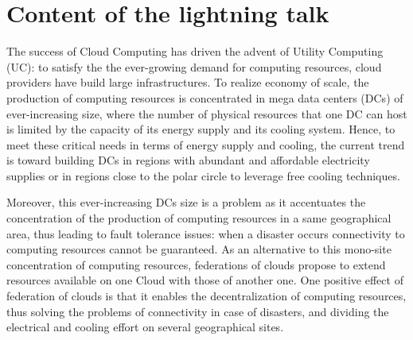 \section{Content of the lightning talk}
\label{sec:intro} 

The success of Cloud Computing has driven the advent of Utility Computing (UC): 
to satisfy the the ever-growing demand for computing resources, cloud providers 
have build large infrastructures. To realize economy of scale, the production
of computing resources is concentrated in mega data centers (DCs) of 
ever-increasing size, where the number of physical resources that one DC can 
host is limited by the capacity of its energy supply and its cooling system. 
Hence, to meet these critical needs in terms of energy supply and cooling, the 
current trend is toward building DCs in regions with abundant and affordable 
electricity supplies or in regions close to the polar circle to leverage free 
cooling techniques. 


Moreover, this ever-increasing DCs size is a problem as it accentuates the 
concentration of the production of computing resources in a same geographical
area, thus leading to fault tolerance issues: when a disaster occurs 
connectivity to computing resources cannot be guaranteed. As an alternative to 
this mono-site concentration of computing resources, federations of clouds 
propose to extend resources available on one Cloud with those of another one. 
One positive effect of federation of clouds is that it enables the 
decentralization of computing resources, thus solving the problems of 
connectivity in case of disasters, and dividing the electrical and cooling 
effort on several geographical sites.

